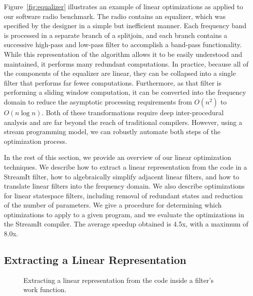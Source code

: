 Figure~\ref{fig:equalizer} illustrates an example of linear
optimizations as applied to our software radio benchmark.  The radio
contains an equalizer, which was specified by the designer in a simple
but inefficient manner.  Each frequency band is processed in a
separate branch of a splitjoin, and each branch contains a successive
high-pass and low-pass filter to accomplish a band-pass functionality.
While this representation of the algorithm allows it to be easily
understood and maintained, it performs many redundant computations.  In
practice, because all of the components of the equalizer are linear,
they can be collapsed into a single filter that performs far fewer
computations.  Furthermore, as that filter is performing a sliding
window computation, it can be converted into the frequency domain to
reduce the asymptotic processing requirements from $O(n^2)$ to $O(n
\log n)$.  Both of these transformations require deep inter-procedural
analysis and are far beyond the reach of traditional compilers.
However, using a stream programming model, we can robustly automate
both steps of the optimization process.

In the rest of this section, we provide an overview of our linear
optimization techniques.  We describe how to extract a linear
representation from the code in a StreamIt filter, how to
algebraically simplify adjacent linear filters, and how to translate
linear filters into the frequency domain.  We also describe
optimizations for linear statespace filters, including removal of
redundant states and reduction of the number of parameters.  We give a
procedure for determining which optimizations to apply to a given
program, and we evaluate the optimizations in the StreamIt compiler.
The average speedup obtained is 4.5x, with a maximum of 8.0x.

\subsection*{Extracting a Linear Representation}

\begin{figure}[t]
\centering
{}
\caption[Extracting a linear representation.]{Extracting a linear
  representation from the code inside a filter's work
  function.\protect\label{fig:extraction}}
\end{figure}

